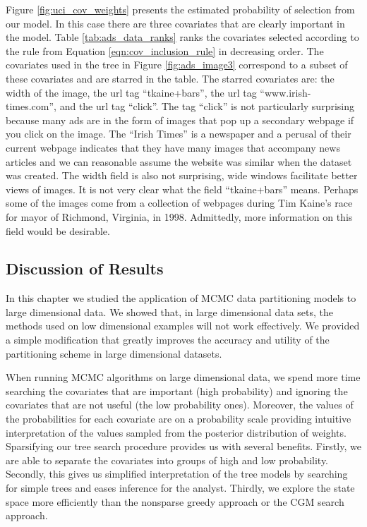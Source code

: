 Figure \ref{fig:uci_cov_weights} presents the estimated  probability of selection from our model. In this case there are three covariates that are clearly important in the model. Table \ref{tab:ads_data_ranks} ranks the covariates selected according to the rule from Equation \ref{eqn:cov_inclusion_rule} in decreasing order. The covariates used in the tree in Figure \ref{fig:ads_image3} correspond to a subset of these covariates and are starred in the table. The starred covariates are: the width of the image, the url tag ``tkaine+bars'', the url tag ``www.irish-times.com'', and the url tag ``click''. The tag ``click'' is not particularly surprising because many ads are in the form of images that pop up a secondary webpage if you click on the image. The ``Irish Times'' is a newspaper and a perusal of their current webpage indicates that they have many images that accompany news articles and we can reasonable assume the website was similar when the dataset was created. The width field is also not surprising, wide windows facilitate better views of images. It is not very clear what the field ``tkaine+bars'' means. Perhaps some of the images come from a collection of webpages during Tim Kaine's race for mayor of Richmond, Virginia, in 1998. Admittedly, more information on this field would be desirable. 
 
\subsection{Discussion of Results}\label{sec:conc}
In this chapter we studied the application of MCMC data partitioning models to large dimensional data. We showed that, in large dimensional data sets, the methods used on low dimensional examples will not work effectively. We provided a simple modification that greatly improves the accuracy and utility of the partitioning scheme in large dimensional datasets. 

 When running MCMC algorithms on large dimensional data, we spend more time searching the covariates that are important (high probability) and ignoring the covariates that are not useful (the low probability ones). Moreover, the values of the probabilities for each covariate are on a probability scale providing intuitive interpretation of the values sampled from the posterior distribution of weights.
Sparsifying our tree search procedure provides us with several benefits. Firstly, we are able to separate the covariates into groups of high and low probability. Secondly, this gives us simplified interpretation of the tree models by searching for simple trees and eases inference for the analyst. Thirdly, we explore the state space more efficiently than the nonsparse greedy approach or the CGM search approach. 

